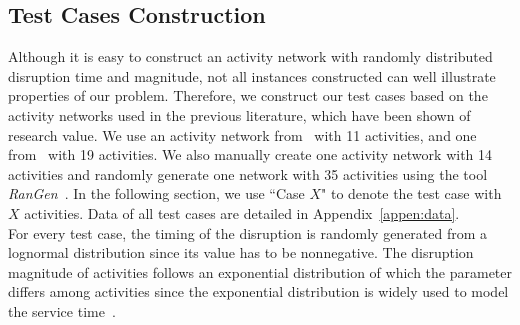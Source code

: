 \documentclass[11pt]{article}
\newcommand{\noi}{\noindent}
\begin{document}
	\subsection{Test Cases Construction} \label{subsec:testcases}
	\noi Although it is easy to construct an activity network with randomly distributed disruption time and magnitude, not all instances constructed can well illustrate properties of our problem. Therefore, we construct our test cases based on the activity networks used in the previous literature, which have been shown of research value. We use an activity network from~\citet{plambeck1996sample} with 11 activities, and %
	one from~\citet{Elmaghraby77} with 19 activities. 
	We also manually create one activity network with 14 activities and randomly generate one network with 35 activities using the tool \emph{RanGen}~\citep{demeulemeester2003rangen}.
	In the following section, we use ``Case \(X\)" to denote the test case with \(X\) activities. Data of all test cases are detailed in Appendix~\ref{appen:data}.\\
	\newline
	For every test case, the timing of the disruption is randomly generated from a lognormal distribution since its value has to be nonnegative. The disruption magnitude of activities follows an exponential distribution of which the parameter differs among activities since the exponential distribution is widely used to model the service time~\citep{ross1996stochastic}.
\end{document}

